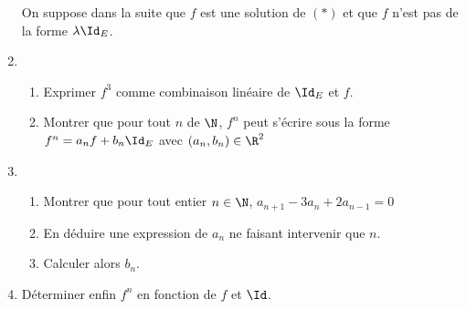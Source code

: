\documentclass[a4paper, 11pt,reqno]{article}
\begin{document}
\begin{exercice}
\begin{enumerate}
On suppose dans la suite que $f$ est une solution de $(*)$ et que $f$ n'est pas de la forme $\lambda \Id_E$. 

\item \begin{enumerate}
\item Exprimer $f^3$ comme combinaison linéaire de $\Id_E$ et $f$. 
\item Montrer que pour tout $n$ de $\N$, $f^n$ peut s'écrire sous la forme $f^n = a_n f +b_n \Id_E$ avec $(a_n,b_n) \in \R^2$

\end{enumerate}
\item \begin{enumerate}
\item Montrer que pour tout entier $n\in \N$, $a_{n+1} -3a_n +2a_{n-1} = 0$
\item En déduire une expression de $a_n$ ne faisant intervenir que $n$. 
\item Calculer alors $b_n$.
\end{enumerate}
\item Déterminer enfin $f^n$ en fonction de $f$ et $\Id$. 

\end{enumerate}


\end{exercice}
\end{document}
